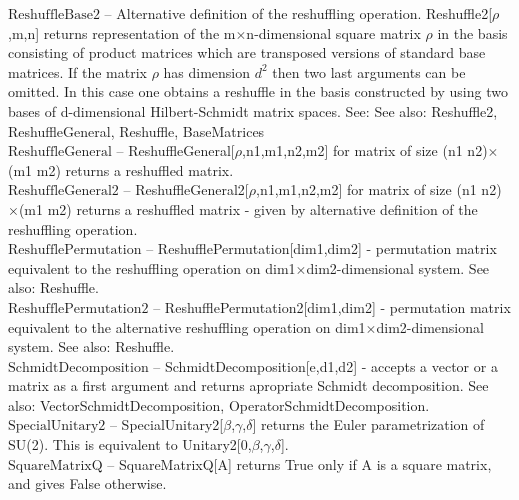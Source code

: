 \documentclass[a4paper,10pt]{scrartcl}
\begin{document}
\textbf{$ \text{ReshuffleBase2} $ }-- Alternative definition of the reshuffling operation. Reshuffle2[$\rho $,m,n] returns representation of the m$\times $n-dimensional square matrix $\rho $ in the basis consisting of product matrices which are transposed versions of standard base matrices. If the matrix $\rho $ has dimension $ d^2 $ then two last arguments can be omitted. In this case one obtains a reshuffle in the basis constructed by using two bases of d-dimensional Hilbert-Schmidt matrix spaces. See: See also: Reshuffle2, ReshuffleGeneral, Reshuffle, BaseMatrices$  $\\

\textbf{$ \text{ReshuffleGeneral} $ }-- ReshuffleGeneral[$\rho $,n1,m1,n2,m2] for matrix of size (n1 n2)$\times $(m1 m2) returns a reshuffled matrix.$  $\\

\textbf{$ \text{ReshuffleGeneral2} $ }-- ReshuffleGeneral2[$\rho $,n1,m1,n2,m2] for matrix of size (n1 n2)$\times $(m1 m2) returns a reshuffled matrix - given by alternative definition of the reshuffling operation.$  $\\

\textbf{$ \text{ReshufflePermutation} $ }-- ReshufflePermutation[dim1,dim2] - permutation matrix equivalent to the reshuffling operation on dim1$\times $dim2-dimensional system. See also: Reshuffle.$  $\\

\textbf{$ \text{ReshufflePermutation2} $ }-- ReshufflePermutation2[dim1,dim2] - permutation matrix equivalent to the alternative reshuffling operation on dim1$\times $dim2-dimensional system. See also: Reshuffle.$  $\\

\textbf{$ \text{SchmidtDecomposition} $ }-- SchmidtDecomposition[e,d1,d2] - accepts a vector or a matrix as a first argument and returns apropriate Schmidt decomposition. See also: VectorSchmidtDecomposition, OperatorSchmidtDecomposition.$  $\\

\textbf{$ \text{SpecialUnitary2} $ }-- SpecialUnitary2[$\beta $,$\gamma $,$\delta $] returns the Euler parametrization of SU(2). This is equivalent to Unitary2[0,$\beta $,$\gamma $,$\delta $].$  $\\

\textbf{$ \text{SquareMatrixQ} $ }-- SquareMatrixQ[A] returns True only if A is a square matrix, and gives False otherwise.$  $\\
\end{document}
